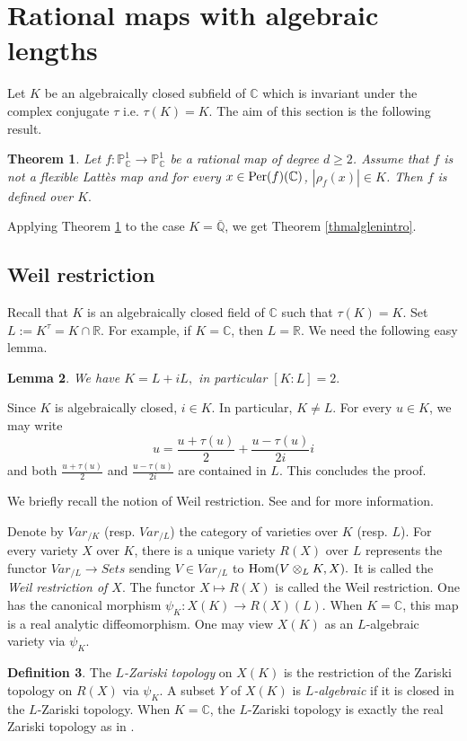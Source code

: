 \documentclass[12pt]{amsart}
\theoremstyle{plain}
\newtheorem{Thm}{Theorem}[section]
\newtheorem{Lem}[Thm]{Lemma}
\theoremstyle{remark}
\theoremstyle{definition}
\newtheorem{Def}[Thm]{Definition}
\def\Q{\mathbb Q}
\def\R{\mathbb R}
\def\C{\mathbb C}
\def\P{\mathbb P}
\def\Hom{{\rm Hom}}
\begin{document}
\section{Rational maps with algebraic lengths}
Let $K$ be an algebraically closed subfield of $\C$ which is invariant under the complex conjugate $\tau$ i.e. $\tau(K)=K.$
The aim of this section is the following result.

\begin{Thm}\label{thmalglen}Let $f: \P_{\C}^1\to \P_{\C}^1$ be a rational map of degree $d\geq 2$.
	Assume that  $f$ is not a flexible Latt\`es map and  for every $x\in {\rm Per}(f)(\C)$, $|\rho_f(x)|\in K$. Then $f$ is defined over $K.$
\end{Thm}

Applying  Theorem \ref{thmalglen} to the case $K=\overline{\Q}$, we get Theorem \ref{thmalglenintro}.




\subsection{Weil restriction}\label{sectionweilrest}
Recall that $K$ is an algebraically closed field of $\C$ such that $\tau(K)=K.$
Set $L:=K^{\tau}=K\cap \R.$ 
For example, if $K=\C$, then $L=\R.$
We need the following easy lemma.
\begin{Lem}\label{lemkoltwo}We have $K=L+iL,$ in particular $[K:L]=2.$  
\end{Lem}
Since $K$ is algebraically closed, $i\in K$. In particular, $K\neq L.$
For every $u\in K$, we may write $$u=\frac{u+\tau(u)}{2}+ \frac{u-\tau(u)}{2i}i$$ 
and both $\frac{u+\tau(u)}{2}$ and $\frac{u-\tau(u)}{2i}$ are contained in $L$. This concludes the proof.
\endproof






We briefly recall the notion of Weil restriction.  See \cite[Section 4.6]{Poonen2017} and \cite[Section 7.6]{Bosch1990} for more information. 

\medskip


Denote by $Var_{/K}$ (resp. $Var_{/L}$) the category of varieties over $K$ (resp. $L$).
For every variety $X$ over $K$, there is a unique variety $R(X)$ over $L$ represents the functor $Var_{/L}\to Sets$
sending $V\in Var_{/L}$ to $\Hom(V\otimes_{L}K, X).$
It is called the \emph{Weil restriction of $X$}. The functor $X\mapsto R(X)$ is called the Weil restriction.
One has the canonical morphism 
$\psi_K: X(K)\to R(X)(L).$ 
When $K=\C$, this map is a real analytic diffeomorphism. One may view $X(K)$ as an $L$-algebraic variety via $\psi_K.$
\begin{Def}\label{defirealzt}The \emph{$L$-Zariski topology} on $X(K)$ is the restriction of the Zariski topology on $R(X)$ via $\psi_K$.
A subset $Y$ of $X(K)$ is \emph{$L$-algebraic} if it is closed in the $L$-Zariski topology.
When $K=\C$, the $L$-Zariski topology is exactly the real Zariski topology as in \cite[Section 8.1.1]{Ji2023}.
\end{Def}
\end{document}
